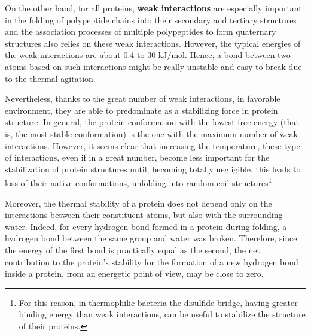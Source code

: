 On the other hand, for all proteins, \textbf{weak interactions} are especially important in the folding of polypeptide chains into their secondary and tertiary structures and the association processes of multiple polypeptides to form quaternary structures also relies on these weak interactions. However, the typical energies of the weak interactions are about 0.4 to 30 kJ$/$mol. Hence, a bond between two atoms based on such interactions might be really unstable and easy to break due to the thermal agitation.

Nevertheless, thanks to the great number of weak interactions, in favorable environment, they are able to predominate as a stabilizing force in protein structure. In general, the protein conformation with the lowest free energy (that is, the most stable conformation) is the one with the maximum number of weak interactions. However, it seems clear that increasing the temperature, these type of interactions, even if in a great number, become less important for the stabilization of protein structures until, becoming totally negligible, this leads to loss of their native conformations, unfolding into random-coil structures\footnote{For this reason, in thermophilic bacteria the disulfide bridge, having greater binding energy than weak interactions, can be useful to stabilize the structure of their proteins.}.

Moreover, the thermal stability of a protein does not depend only on the interactions between their constituent atoms, but also with the surrounding water. 
Indeed, for every hydrogen bond formed in a protein during folding, a hydrogen bond %
between the same group and water was broken. Therefore, since the energy of the first bond is practically equal as the second, the net contribution to the protein's stability for the formation of a new hydrogen bond inside a protein, from an energetic point of view, may be close to zero. 

